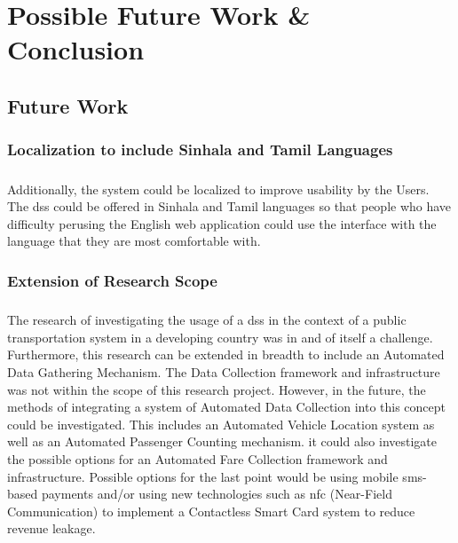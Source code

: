 
\chapter {Possible Future Work \& Conclusion }
\label{chapter-ConclusionAndFutureWork}

\section{Future Work}
\label{section-FutureWork}

\subsection{Localization to include Sinhala and Tamil Languages}

\paragraph{} Additionally, the system could be localized to improve usability by the Users. The \acrshort{dss} could be offered in Sinhala and Tamil languages so that people who have difficulty perusing the English web application could use the interface with the language that they are most comfortable with.

\subsection{Extension of Research Scope}

\paragraph{} The research of investigating the usage of a \acrshort{dss} in the context of a public transportation system in a developing country was in and of itself a challenge. Furthermore, this research can be extended in breadth to include an Automated Data Gathering Mechanism. The Data Collection framework and infrastructure was not within the scope of this research project. However, in the future, the methods of integrating a system of Automated Data Collection into this concept could be investigated. This includes an Automated Vehicle Location system as well as an Automated Passenger Counting mechanism. it could also investigate the possible options for an Automated Fare Collection framework and infrastructure. Possible options for the last point would be using mobile \acrshort{sms}-based payments and/or using new technologies such as \acrshort{nfc} (Near-Field Communication) to implement a Contactless Smart Card system to reduce revenue leakage.

